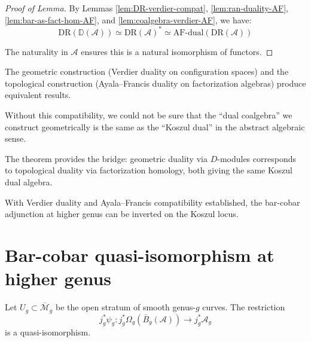 \begin{proof}[Proof of Lemma]
By Lemmas \ref{lem:DR-verdier-compat}, \ref{lem:ran-duality-AF}, \ref{lem:bar-as-fact-hom-AF}, and 
\ref{lem:coalgebra-verdier-AF}, we have:
\[\text{DR}(\mathbb{D}(\mathcal{A})) \simeq \text{DR}(\mathcal{A})^* 
\simeq \text{AF-dual}(\text{DR}(\mathcal{A}))\]

The naturality in $\mathcal{A}$ ensures this is a natural isomorphism of functors.
\end{proof}

\begin{remark}\label{rem:importance-koszul-AF}
The geometric construction (Verdier duality on configuration spaces) and the topological construction (Ayala--Francis duality on factorization algebras) produce equivalent results.

Without this compatibility, we could not be sure that the ``dual coalgebra'' we construct
geometrically is the same as the ``Koszul dual'' in the abstract algebraic sense.

The theorem provides the bridge: geometric duality via $D$-modules corresponds to 
topological duality via factorization homology, both giving the same Koszul dual algebra.
\end{remark}

With Verdier duality and Ayala--Francis compatibility established, the bar-cobar adjunction at higher genus can be inverted on the Koszul locus.


\section{Bar-cobar quasi-isomorphism at higher genus}
\label{sec:bar-cobar-qi-higher-genus}

\begin{lemma}\label{lem:higher-genus-open-stratum-qi}
Let $U_g \subset \overline{\mathcal{M}}_g$ be the open stratum of smooth genus-$g$
curves. The restriction
\[j_g^*\psi_g: j_g^*\Omega_g(\bar{B}_g(\mathcal{A})) \longrightarrow j_g^*\mathcal{A}_g\]
is a quasi-isomorphism.
\end{lemma}

